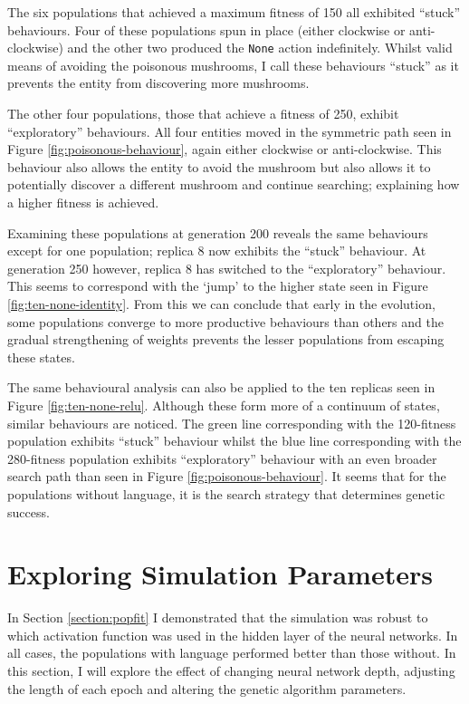 \documentclass[12pt,a4paper]{report}
\begin{document}
The six populations that achieved a maximum fitness of 150 all exhibited ``stuck'' behaviours. Four of these populations spun in place (either clockwise or anti-clockwise) and the other two produced the \verb~None~ action indefinitely. Whilst valid means of avoiding the poisonous mushrooms, I call these behaviours ``stuck'' as it prevents the entity from discovering more mushrooms.

The other four populations, those that achieve a fitness of 250, exhibit ``exploratory'' behaviours. All four entities moved in the symmetric path seen in Figure \ref{fig:poisonous-behaviour}, again either clockwise or anti-clockwise. This behaviour also allows the entity to avoid the mushroom but also allows it to potentially discover a different mushroom and continue searching; explaining how a higher fitness is achieved. 

Examining these populations at generation 200 reveals the same behaviours except for one population; replica 8 now exhibits the ``stuck'' behaviour. At generation 250 however, replica 8 has switched to the ``exploratory'' behaviour. This seems to correspond with the `jump' to the higher state seen in Figure \ref{fig:ten-none-identity}. From this we can conclude that early in the evolution, some populations converge to more productive behaviours than others and the gradual strengthening of weights prevents the lesser populations from escaping these states.

The same behavioural analysis can also be applied to the ten replicas seen in Figure \ref{fig:ten-none-relu}. Although these form more of a continuum of states, similar behaviours are noticed. The green line corresponding with the 120-fitness population exhibits ``stuck'' behaviour whilst the blue line corresponding with the 280-fitness population exhibits ``exploratory'' behaviour with an even broader search path than seen in Figure \ref{fig:poisonous-behaviour}. It seems that for the populations without language, it is the search strategy that determines genetic success.

\section{Exploring Simulation Parameters}\label{section:simulation-parameters}

In Section \ref{section:popfit} I demonstrated that the simulation was robust to which activation function was used in the hidden layer of the neural networks. In all cases, the populations with language performed better than those without. In this section, I will explore the effect of changing neural network depth, adjusting the length of each epoch and altering the genetic algorithm parameters.
\end{document}
